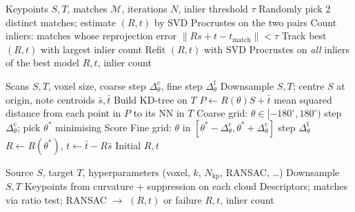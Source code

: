 \documentclass[11pt,a4paper]{article}
\begin{document}
\begin{algorithm}
\caption{RANSAC for 2D rigid alignment (\texttt{ransac\_align})}
\begin{algorithmic}[1]
\Require Keypoints $S, T$, matches $\mathcal{M}$, iterations $N$, inlier threshold $\tau$
    \State Randomly pick 2 distinct matches; estimate $(R,t)$ by SVD Procrustes on the two pairs
    \State Count inliers: matches whose reprojection error $\|R s + t - t_{\mathrm{match}}\| < \tau$
    \State Track best $(R,t)$ with largest inlier count
\EndFor
\State Refit $(R,t)$ with SVD Procrustes on \emph{all} inliers of the best model
\Ensure $R, t$, inlier count
\end{algorithmic}
\end{algorithm}

\begin{algorithm}
\caption{Correlative rotation search (\texttt{rotation\_search})}
\begin{algorithmic}[1]
\Require Scans $S, T$, voxel size, coarse step $\Delta_\theta^{\mathrm{c}}$, fine step $\Delta_\theta^{\mathrm{f}}$
\State Downsample $S,T$; centre $S$ at origin, note centroids $\bar{s},\bar{t}$
\State Build KD-tree on $T$
    \State $P \gets R(\theta) S + \bar{t}$ 
    \State \Return mean squared distance from each point in $P$ to its NN in $T$
\EndFunction
\State Coarse grid: $\theta \in [-180^\circ,180^\circ)$ step $\Delta_\theta^{\mathrm{c}}$; pick $\theta^\ast$ minimising Score
\State Fine grid: $\theta$ in $[\theta^\ast - \Delta_\theta^{\mathrm{c}}, \theta^\ast + \Delta_\theta^{\mathrm{c}}]$ step $\Delta_\theta^{\mathrm{f}}$
\State $R \gets R(\theta^\ast)$, \quad $t \gets \bar{t} - R \bar{s}$
\Ensure Initial $R, t$
\end{algorithmic}
\end{algorithm}

\begin{algorithm}
\caption{Feature-based alignment pipeline (\texttt{feature\_based\_alignment})}
\begin{algorithmic}[1]
\Require Source $S$, target $T$, hyperparameters (voxel, $k$, $N_{\mathrm{kp}}$, RANSAC, \ldots)
\State Downsample $S,T$
\State Keypoints from curvature + suppression on each cloud
\State Descriptors; matches via ratio test; RANSAC $\to$ $(R,t)$ or failure
\Ensure $R, t$, inlier count
\end{algorithmic}
\end{algorithm}
\end{document}
